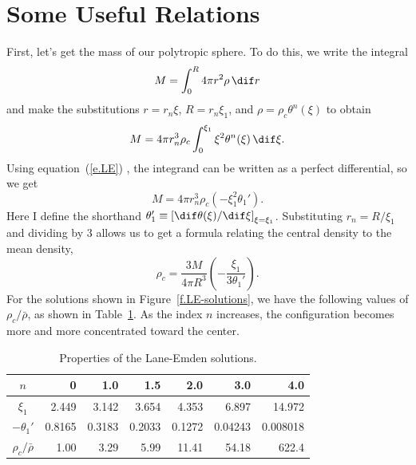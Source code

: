 \section{Some Useful Relations}

First, let's get the mass of our polytropic sphere.  To do this, we write the integral
\[ M = \int_{0}^{R} 4\pi r^{2} \rho\,\dif r \]
and make the substitutions $r = r_{n}\xi$, $R = r_{n}\xi_{1}$, and $\rho = \rho_{c}\theta^{n}(\xi)$ to obtain
\[
M = 4\pi r_{n}^{3}\rho_{c}\int_{0}^{\xi_{1}} \xi^{2}\theta^{n}(\xi)\,\dif\xi.
\]
Using equation~(\ref{e.LE}) , the integrand can be written as a perfect differential, so we get
\begin{equation}\label{e.LE-mass}
M = 4\pi r_{n}^{3} \rho_{c}\left(-\xi_{1}^{2} \theta_{1}'\right).
\end{equation}
Here I define the shorthand $\theta_{1}' \equiv \left[\dif\theta(\xi)/\dif\xi\right]_{\xi=\xi_{1}}$.  Substituting $r_{n} = R/\xi_{1}$ and dividing by 3 allows us to get a formula relating the central density to the mean density,
\begin{equation}\label{e.LE-density-ratio}
\rho_{c} = \frac{3M}{4\pi R^{3}}\left(-\frac{\xi_{1}}{3\theta_{1}'}\right).
\end{equation}
For the solutions shown in Figure~\ref{f.LE-solutions}, we have the following values of $\rho_{c}/\bar{\rho}$, as shown in Table~\ref{t.LE-properties}.
As the index $n$ increases, the configuration becomes more and more concentrated toward the center.

\begin{table}[htpb]
\caption{Properties of the Lane-Emden solutions.\label{t.LE-properties}}
\begin{center}
\begin{tabular}{c|rrrrrr}
\hline
$n$ & 0 & 1.0 & 1.5 & 2.0 & 3.0 & 4.0 \\
\hline\hline
$\xi_{1}$ & 2.449 & 3.142 & 3.654 & 4.353 & 6.897 & 14.972\\
$-\theta_{1}'$ & 0.8165 & 0.3183 & 0.2033 & 0.1272 & 0.04243 & 0.008018\\
$\rho_{c}/\bar{\rho}$ & 1.00 & 3.29 & 5.99 & 11.41 & 54.18 & 622.4\\
\hline
\end{tabular}
\end{center}
\end{table}

